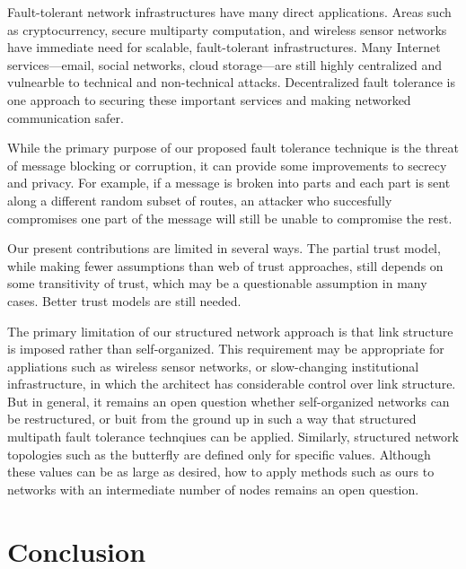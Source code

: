 \documentclass{sig-alternate-05-2015}
\begin{document}
Fault-tolerant network infrastructures have many direct applications.
Areas such as cryptocurrency, secure multiparty computation, and wireless
sensor networks have immediate need for scalable, fault-tolerant
infrastructures.
Many Internet services---email, social networks, cloud storage---are still
highly centralized and vulnearble to technical and non-technical attacks.
Decentralized fault tolerance is one approach to securing these important
services and making networked communication safer.

While the primary purpose of our proposed fault tolerance technique is the
threat of message blocking or corruption, it can provide some improvements
to secrecy and privacy.
For example, if a message is broken into parts and each part is sent along
a different random subset of routes, an attacker who succesfully compromises
one part of the message will still be unable to compromise the rest.

Our present contributions are limited in several ways.
The partial trust model, while making fewer assumptions than web of trust
approaches, still depends on some transitivity of trust,
which may be a questionable assumption in many cases.
Better trust models are still needed.

The primary limitation of our structured network approach is that
link structure is imposed rather than self-organized.
This requirement may be appropriate for appliations such as
wireless sensor networks,
or slow-changing institutional infrastructure,
in which the architect has considerable control over link structure.
But in general, it remains an open question whether self-organized networks
can be restructured, or buit from the ground up in such a way that
structured multipath fault tolerance technqiues can be applied.
Similarly, structured network topologies such as the butterfly are defined
only for specific values.
Although these values can be as large as desired,
how to apply methods such as ours to networks with an intermediate number
of nodes remains an open question.

\section{Conclusion}
\end{document}
